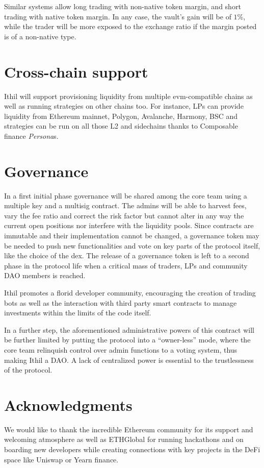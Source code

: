 \documentclass[a4paper,10 pt]{article}
\theoremstyle{definition}
\begin{document}
Similar systems allow long trading with non-native token margin, and short trading with native token margin. In any case, the vault's gain will be of $1$\%, while the trader will be more exposed to the exchange ratio if the margin posted is of a non-native type.

\section{Cross-chain support}
Ithil will support provisioning liquidity from multiple evm-compatible chains as well as running strategies on other chains too.
For instance, LPs can provide liquidity from Ethereum mainnet, Polygon, Avalanche, Harmony, BSC and strategies can be run on all those L2 and sidechains thanks to Composable finance \textit{Persona}s.

\section{Governance}
In a first initial phase governance will be shared among the core team using a multiple key and a multisig contract. The admins will be able to harvest fees, vary the fee ratio and correct the risk factor but cannot alter in any way the current open positions nor interfere with the liquidity pools.
Since contracts are immutable and their implementation cannot be changed, a governance token may be needed to push new functionalities and vote on key parts of the protocol itself, like the choice of the dex. The release of a governance token is left to a second phase in the protocol life when a critical mass of traders, LPs and community DAO members is reached.

Ithil promotes a florid developer community, encouraging the creation of trading bots as well as the interaction with third party smart contracts to manage investments within the limits of the code itself.

In a further step, the aforementioned administrative powers of this contract will be further limited by putting the protocol into a “owner-less” mode, where the core team relinquish control over admin functions to a voting system, thus making Ithil a DAO. A lack of centralized power is essential to the trustlessness of the protocol.

\section{Acknowledgments}

We would like to thank the incredible Ethereum community for its support and welcoming atmosphere as well as ETHGlobal for running hackathons and on boarding new developers while creating connections with key projects in the DeFi space like Uniswap or Yearn finance.
\end{document}
